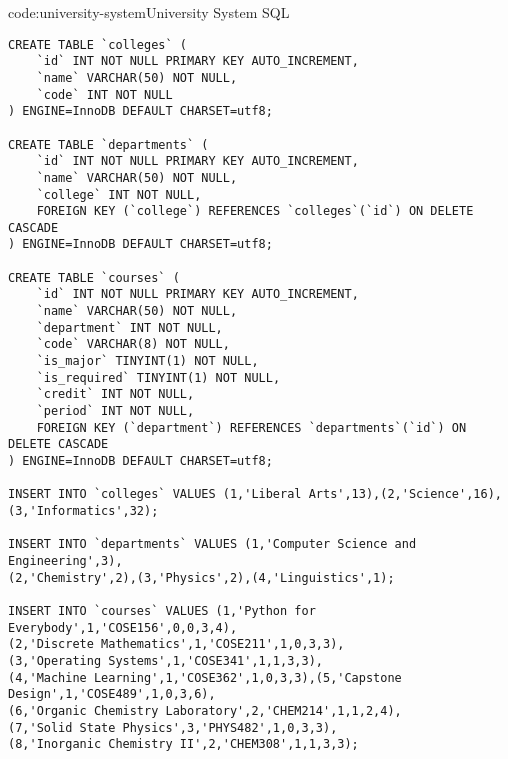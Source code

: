 \begin{code}{code:university-system}{University System SQL}
\begin{verbatim}
CREATE TABLE `colleges` (
    `id` INT NOT NULL PRIMARY KEY AUTO_INCREMENT,
    `name` VARCHAR(50) NOT NULL,
    `code` INT NOT NULL
) ENGINE=InnoDB DEFAULT CHARSET=utf8;

CREATE TABLE `departments` (
    `id` INT NOT NULL PRIMARY KEY AUTO_INCREMENT,
    `name` VARCHAR(50) NOT NULL,
    `college` INT NOT NULL,
    FOREIGN KEY (`college`) REFERENCES `colleges`(`id`) ON DELETE CASCADE
) ENGINE=InnoDB DEFAULT CHARSET=utf8;

CREATE TABLE `courses` (
    `id` INT NOT NULL PRIMARY KEY AUTO_INCREMENT,
    `name` VARCHAR(50) NOT NULL,
    `department` INT NOT NULL,
    `code` VARCHAR(8) NOT NULL,
    `is_major` TINYINT(1) NOT NULL,
    `is_required` TINYINT(1) NOT NULL,
    `credit` INT NOT NULL,
    `period` INT NOT NULL,
    FOREIGN KEY (`department`) REFERENCES `departments`(`id`) ON DELETE CASCADE
) ENGINE=InnoDB DEFAULT CHARSET=utf8;

INSERT INTO `colleges` VALUES (1,'Liberal Arts',13),(2,'Science',16),
(3,'Informatics',32);

INSERT INTO `departments` VALUES (1,'Computer Science and Engineering',3),
(2,'Chemistry',2),(3,'Physics',2),(4,'Linguistics',1);

INSERT INTO `courses` VALUES (1,'Python for Everybody',1,'COSE156',0,0,3,4),
(2,'Discrete Mathematics',1,'COSE211',1,0,3,3),
(3,'Operating Systems',1,'COSE341',1,1,3,3),
(4,'Machine Learning',1,'COSE362',1,0,3,3),(5,'Capstone Design',1,'COSE489',1,0,3,6),
(6,'Organic Chemistry Laboratory',2,'CHEM214',1,1,2,4),
(7,'Solid State Physics',3,'PHYS482',1,0,3,3),
(8,'Inorganic Chemistry II',2,'CHEM308',1,1,3,3);
\end{verbatim}
\end{code}


